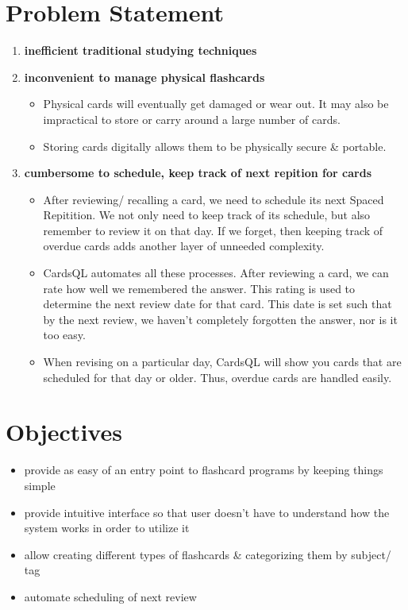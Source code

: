 \documentclass[a4paper]{article}
\begin{document}
\section{Problem Statement}
\label{sec:orgb4980ef}
\begin{enumerate}
\item \textbf{inefficient traditional studying techniques}
\item \textbf{inconvenient to manage physical flashcards}   
\begin{itemize}
\item Physical cards will eventually get damaged or wear out. It may also be impractical to store or carry around a large number of cards.
\item Storing cards digitally allows them to be physically secure \& portable.
\end{itemize}
\item \textbf{cumbersome to schedule, keep track of next repition for cards}   
\begin{itemize}
\item After reviewing/ recalling a card, we need to schedule its next Spaced Repitition. We not only need to keep track of its schedule, but also remember to review it on that day. If we forget, then keeping track of overdue cards adds another layer of unneeded complexity.

\item CardsQL automates all these processes. After reviewing a card, we can rate how well we remembered the answer. This rating is used to determine the next review date for that card. This date is set such that by the next review, we haven't completely forgotten the answer, nor is it too easy.
\item When revising on a particular day, CardsQL will show you cards that are scheduled for that day or older. Thus, overdue cards are handled easily.
\end{itemize}
\end{enumerate}

\section{Objectives}
\label{sec:orgf37d16d}
\begin{itemize}
\item provide as easy of an entry point to flashcard programs by keeping things simple
\item provide intuitive interface so that user doesn't have to understand how the system works in order to utilize it
\item allow creating different types of flashcards \& categorizing them by subject/ tag
\item automate scheduling of next review
\end{itemize}
\end{document}
